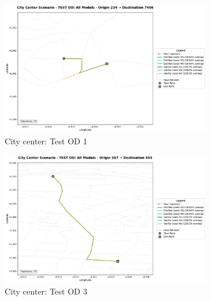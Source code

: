 \begin{figure}[H]
    \centering
    \begin{subfigure}{0.49\linewidth}
        \centering
        \includegraphics[width=\linewidth]{assets/plots/eval/porto/scenario_cross_model/test/city_center/test_od_comparison_1_origin234_dest7406.pdf}
        \caption{City center: Test OD 1}
    \end{subfigure}
    \begin{subfigure}{0.49\linewidth}
        \centering
        \includegraphics[width=\linewidth]{assets/plots/eval/porto/scenario_cross_model/test/city_center/test_od_comparison_3_origin587_dest554.pdf}
        \caption{City center: Test OD 3}
    \end{subfigure}
    \begin{subfigure}{0.49\linewidth}
        \centering

\end{subfigure}
\end{figure}
